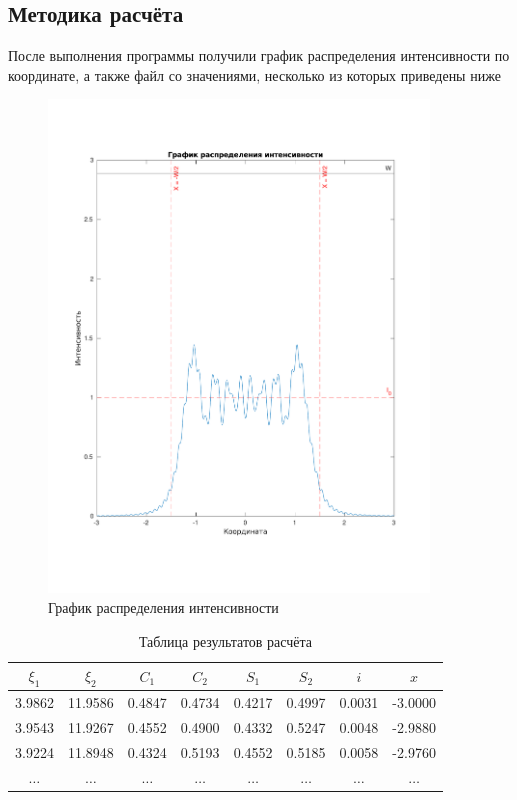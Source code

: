 \documentclass[14pt,a4paper]{extarticle}
\begin{document}
\subsection{Методика расчёта}
После выполнения программы получили график распределения интенсивности по координате, а также файл со значениями, несколько из которых приведены ниже
	\begin{figure}[H]
		\centering
		\includegraphics[trim=40 70 50 70,clip,width=0.9\textwidth]{untitled.pdf}
		\caption{График распределения интенсивности}\label{grafik}
	\end{figure}
	\begin{table}[H]
		
		\begin{center}
	\begin{tabular}{|c|c|c|c|c|c|c|c|}
		\hline
		$\xi_1$ & 		$\xi_2$ & $C_1$ & $C_2$ & $S_1$ & $S_2$ & $i$& $x$\\
		\hline
		3.9862& 11.9586& 0.4847& 0.4734& 0.4217& 0.4997& 0.0031& -3.0000\\
		\hline
		3.9543& 11.9267& 0.4552& 0.4900& 0.4332& 0.5247& 0.0048& -2.9880\\
		\hline
		3.9224& 11.8948& 0.4324& 0.5193& 0.4552& 0.5185& 0.0058& -2.9760\\
		\hline
		$\ldots$ &$\ldots$ &$\ldots$ &$\ldots$ &$\ldots$ &$\ldots$ &$\ldots$ &$\ldots$ \\
		\hline
		
	\end{tabular}
\end{center}\caption{Таблица результатов расчёта}
	\end{table}
\end{document}
